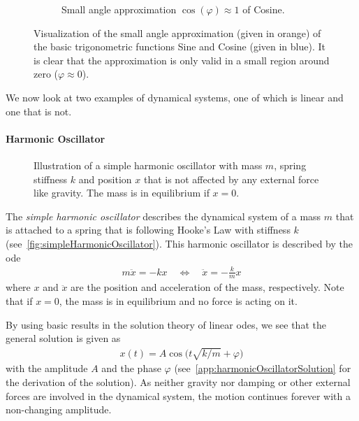 \begin{figure}
\begin{subfigure}[t]{0.5\linewidth}
				\caption{Small angle approximation \( \cos(\varphi) \approx 1 \) of Cosine.}
			\end{subfigure}
			\caption{Visualization of the small angle approximation (given in orange) of the basic trigonometric functions Sine and Cosine (given in blue). It is clear that the approximation is only valid in a small region around zero (\( \varphi \approx 0 \)).}
			\label{fig:smallAngleApproximation}
		\end{figure}

		We now look at two examples of dynamical systems, one of which is linear and one that is not.

		\paragraph{Harmonic Oscillator}
			\label{subsec:harmonicOscillator}

			\begin{figure}
				\centering
				\tikzHarmonicOscillator
				\caption{Illustration of a simple harmonic oscillator with mass \(m\), spring stiffness \(k\) and position \(x\) that is not affected by any external force like gravity. The mass is in equilibrium if \( x = 0 \).}
				\label{fig:simpleHarmonicOscillator}
			\end{figure}

			The \emph{simple harmonic oscillator} describes the dynamical system of a mass \(m\) that is attached to a spring that is following Hooke's Law with stiffness \(k\) (see~\autoref{fig:simpleHarmonicOscillator}). This harmonic oscillator is described by the \ac{ode}
			\begin{align}
				m\ddot{x} = -kx \quad\iff\quad \ddot{x} = -\frac{k}{m} x  \label{eq:harmonicOscillator}
			\end{align}
			where \(x\) and \(\ddot{x}\) are the position and acceleration of the mass, respectively. Note that if \( x = 0 \), the mass is in equilibrium and no force is acting on it.

			By using basic results in the solution theory of linear \acp{ode}, we see that the general solution is given as
			\begin{align*}
				x(t) = A \cos\Big(t \sqrt{k / m} + \varphi\Big)
			\end{align*}
			with the amplitude \(A\) and the phase \(\varphi\) (see~\autoref{app:harmonicOscillatorSolution} for the derivation of the solution). As neither gravity nor damping or other external forces are involved in the dynamical system, the motion continues forever with a non-changing amplitude.

